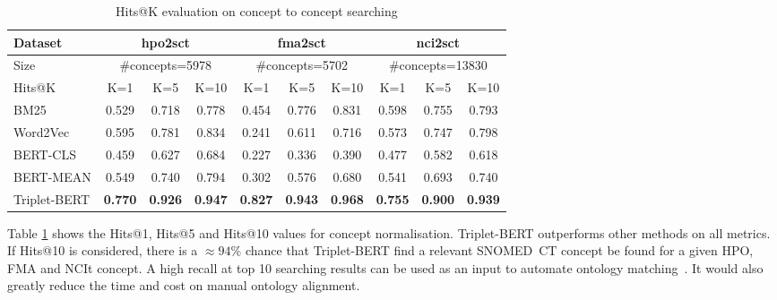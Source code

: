 \documentclass[preprint,12pt]{elsarticle}
\begin{document}
\begin{table}[htbp]
\small
\centering
\caption{Hits@K evaluation on concept to concept searching}
\vspace{-0.5em}
\label{tab:Concept2Concept}
    \begin{tabular}{ |l|c|c|c|c|c|c|c|c|c|} 
        \hline
         Dataset & \multicolumn{3}{|c|}{hpo2sct}  & \multicolumn{3}{|c|}{fma2sct} & \multicolumn{3}{|c|}{nci2sct}\\
        \hline
         Size & \multicolumn{3}{|c|}{\#concepts=5978}  & \multicolumn{3}{|c|}{\#concepts=5702} & \multicolumn{3}{|c|}{\#concepts=13830}\\
        \hline
         Hits@K & K=1 & K=5 & K=10 & K=1 & K=5 & K=10 & K=1 & K=5 & K=10\\
        \hline
        \hline
        BM25 & 0.529 & 0.718 & 0.778 & 0.454 & 0.776 & 0.831 & 0.598 & 0.755 & 0.793\\
        Word2Vec & 0.595 & 0.781 & 0.834 & 0.241 & 0.611 & 0.716 & 0.573 & 0.747 & 0.798\\
        BERT-CLS & 0.459 & 0.627 & 0.684 & 0.227 & 0.336 & 0.390 & 0.477 & 0.582 & 0.618\\
        BERT-MEAN & 0.549 & 0.740 & 0.794 & 0.302 & 0.576 & 0.680 & 0.541 & 0.693 & 0.740\\
        Triplet-BERT & \textbf{0.770} & \textbf{0.926} & \textbf{0.947} & \textbf{0.827} & \textbf{0.943} & \textbf{0.968} & \textbf{0.755} & \textbf{0.900} & \textbf{0.939}\\
        \hline
    \end{tabular}
\end{table} 

Table \ref{tab:Concept2Concept} shows the Hits@1, Hits@5 and Hits@10 values for concept normalisation. Triplet-BERT outperforms other methods on all metrics. If Hits@10 is considered, there is a $\approx 94\%$ chance that Triplet-BERT find a relevant SNOMED~CT concept be found for a given HPO, FMA and NCIt concept. A high recall at top 10 searching results can be used as an input to automate ontology matching~\cite{Hoa2016}. It would also greatly reduce the time and cost on manual ontology alignment.
 
\end{document}
